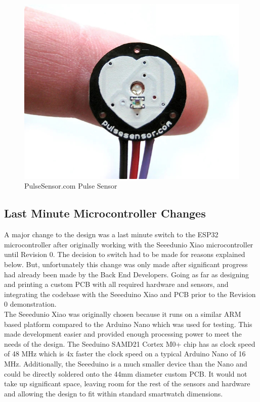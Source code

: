 \documentclass[12pt, titlepage]{article}
\begin{document}
\begin{figure}[H]
\centering
\includegraphics[scale = 0.5]{pulseSensor}
  \caption{PulseSensor.com Pulse Sensor}
  \label{fig:pulseSensor}
\end{figure}


\subsection{Last Minute Microcontroller Changes}\label{microcontroller_change}

A major change to the design was a last minute switch to the ESP32 microcontroller after originally working with the Seeedunio Xiao microcontroller until Revision 0. The decision to switch had to be made for reasons explained below. But, unfortunately this change was only made after significant progress had already been made by the Back End Developers. Going as far as designing and printing a custom PCB with all required hardware and sensors, and integrating the codebase with the Seeeduino Xiao and PCB prior to the Revision 0 demonstration. \\

The Seeedunio Xiao was originally chosen because it runs on a similar ARM based platform compared to the Arduino Nano which was used for testing. This made development easier and provided enough processing power to meet the needs of the design. The Seeduino SAMD21 Cortex M0+ chip has as clock speed of 48 MHz which is 4x faster the clock speed on a typical Arduino Nano of 16 MHz. Additionally, the Seeeduino is a much smaller device than the Nano and could be directly soldered onto the 44mm diameter custom PCB. It would not take up significant space, leaving room for the rest of the sensors and hardware and allowing the design to fit within standard smartwatch dimensions. \\
\end{document}
